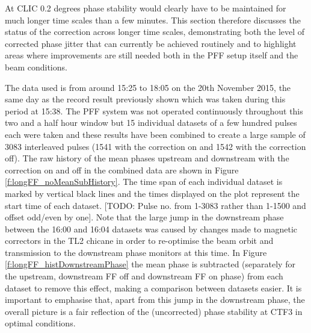 
At CLIC 0.2 degrees phase stability would clearly have to be maintained for much longer time scales than a few minutes. This section therefore discusses the status of the correction across longer time scales, demonstrating both the level of corrected phase jitter that can currently be achieved routinely and to highlight areas where improvements are still needed both in the PFF setup itself and the beam conditions. 

The data used is from around 15:25 to 18:05 on the 20th November 2015, the same day as the record result previously shown which was taken during this period at 15:38. The PFF system was not operated continuously throughout this two and a half hour window but 15 individual datasets of a few hundred pulses each were taken and these results have been combined to create a large sample of 3083 interleaved pulses (1541 with the correction on and 1542 with the correction off). The raw history of the mean phases upstream and downstream with the correction on and off in the combined data are shown in Figure \ref{f:longFF_noMeanSubHistory}. The time span of each individual dataset is marked by vertical black lines and the times displayed on the plot represent the start time of each dataset. [TODO: Pulse no. from 1-3083 rather than 1-1500 and offset odd/even by one]. Note that the large jump in the downstream phase between the 16:00 and 16:04 datasets was caused by changes made to magnetic correctors in the TL2 chicane in order to re-optimise the beam orbit and transmission to the downstream phase monitors at this time. In Figure \ref{f:longFF_histDownstreamPhase} the mean phase is subtracted (separately for the upstream, downstream FF off and downstream FF on phase) from each dataset to remove this effect, making a comparison between datasets easier. It is important to emphasise that, apart from this jump in the downstream phase, the overall picture is a fair reflection of the (uncorrected) phase stability at CTF3 in optimal conditions. 

